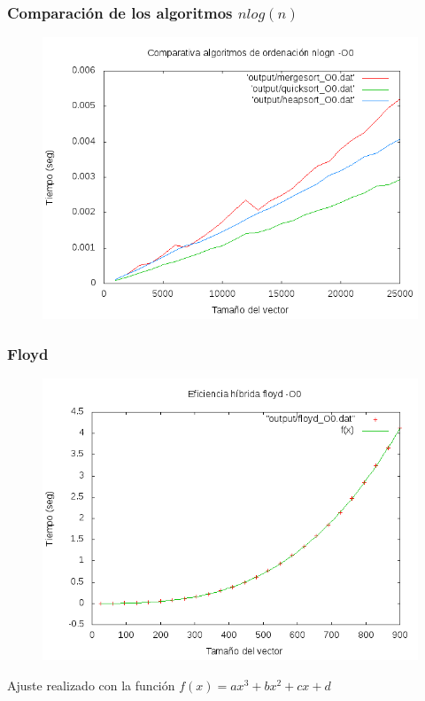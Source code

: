 \documentclass[spanish]{beamer}
\begin{document}
\begin{frame}\frametitle{Comparación de los algoritmos $nlog(n)$}
  \begin{figure}[H]
    \centering   
        \includegraphics[clip,width=1\columnwidth]{../../plots/logaritmicos_O0.png}%
    \end{figure}
  \end{frame}



  

\begin{frame}\frametitle{Floyd}
  \begin{figure}[H]
    \centering   
        \includegraphics[clip,width=0.8\columnwidth]{../../plots/floyd_O0_fit.png}%
      \end{figure}

      Ajuste realizado con la función $f(x) = ax^3 + bx^2 + cx + d$
  \end{frame}
  
\end{document}
